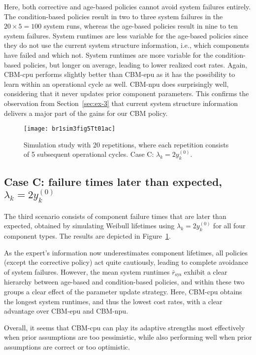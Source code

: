 \documentclass[authoryear]{elsarticle}
\newcommand{\uz}{^{(0)}} %
\def\ykz{y\uz_k}
\newcommand{\mrsys}{\bar{r}_\text{sys}}
\begin{document}
Here, both corrective and age-based policies cannot avoid system failures entirely.
The condition-based policies result in two to three system failures in the $20 \times 5 = 100$ system runs,
whereas the age-based policies result in nine to ten system failures.
System runtimes are less variable for the age-based policies
since they do not use the current system structure information, %
i.e., which components have failed and which not. %
System runtimes are more variable for the condition-based policies,
but longer on average, leading to lower realized cost rates.
Again, CBM-cpu performs slightly better than CBM-epu
as it has the possibility to learn within an operational cycle as well.
CBM-npu does surprisingly well, considering that it never updates prior component parameters. 
This confirms the observation from Section~\ref{sec:ex-3}
that current system structure information delivers a major part of the gains for our CBM policy.

\begin{figure}
\texttt{[image: br1sim3fig5Tt01ac]}
\caption{Simulation study with 20 repetitions, where each repetition consists of 5 subsequent operational cycles.
Case C: $\lambda_k = 2\ykz$.}
\label{fig:br1sim3fig5Tt01}
\end{figure}

\subsection{Case C: failure times later than expected, $\lambda_k = 2 \ykz$}
\label{sec:case3}

The third scenario consists of component failure times that are later than expected,
obtained by simulating Weibull lifetimes using $\lambda_k = 2 \ykz$ for all four component types.
The results are depicted in Figure~\ref{fig:br1sim3fig5Tt01}.

As the expert's information now underestimates component lifetimes,
all policies (except the corrective policy) act quite cautiously,
leading to complete avoidance of system failures.
However, the mean system runtimes $\mrsys$ exhibit
a clear hierarchy between age-based and condition-based policies,
and within these two groups a clear effect of the parameter update strategy.
Here, CBM-cpu obtains the longest system runtimes, and thus the lowest cost rates,
with a clear advantage over CBM-epu and CBM-npu.

Overall, it seems that CBM-cpu can play its adaptive strengths most effectively
when prior assumptions are too pessimistic,
while also performing well when prior assumptions are correct or too optimistic.
\end{document}
